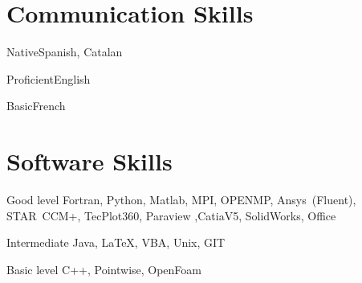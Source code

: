\documentclass[fontsize=10pt]{tccv}
\begin{document}
\section{Communication Skills}

\begin{factlist}
\item{Native}{Spanish, Catalan}
\item{Proficient}{English}
\item{Basic}{French}
\end{factlist}

\section{Software Skills}

\begin{factlist}

\item{Good level}
     {Fortran, Python, Matlab, MPI, OPENMP, Ansys~(Fluent), STAR~CCM+, TecPlot360, Paraview ,CatiaV5, SolidWorks, Office}

\item{Intermediate}
     {Java, \LaTeX, VBA,  Unix, GIT}

\item{Basic level}
     {C++, Pointwise, OpenFoam}

\end{factlist}
\end{document}
